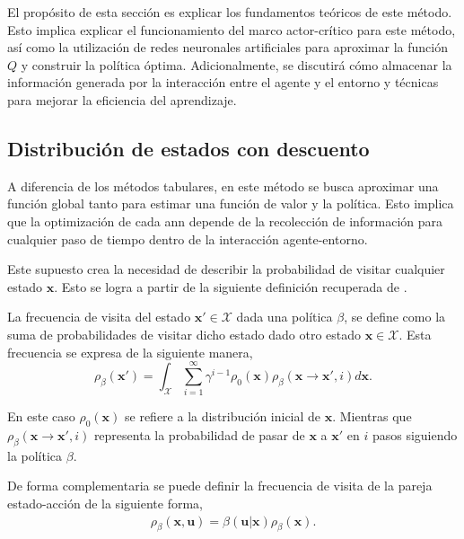 El propósito de esta sección es explicar los fundamentos teóricos de este método. Esto implica explicar el funcionamiento del marco actor-crítico para este método, así como la utilización de redes neuronales artificiales para aproximar la función $Q$ y construir la política óptima. Adicionalmente, se discutirá cómo almacenar la información generada por la interacción entre el agente y el entorno y técnicas para mejorar la eficiencia del aprendizaje.

\subsection{Distribución de estados con descuento}

A diferencia de los métodos tabulares, en este método se busca aproximar una función global tanto para estimar una función de valor y la política. Esto implica que la optimización de cada \acrshort{ann} depende de la recolección de información para cualquier paso de tiempo dentro de la interacción agente-entorno. 

Este supuesto crea la necesidad de describir la probabilidad de visitar cualquier estado $\mathbf{x}$. Esto se logra a partir de la siguiente definición recuperada de \cite{silver14}.

\begin{definition}
    La frecuencia de visita del estado $\mathbf{x}' \in \mathcal{X}$ dada una política $\beta$, se define como la suma de probabilidades de visitar dicho estado dado otro estado $\mathbf{x} \in \mathcal{X}$. Esta frecuencia se expresa de la siguiente manera,
    $$\rho_{\beta}(\mathbf{x}') = \int_{\mathcal{X}}\sum_{i=1}^{\infty}\gamma^{i-1}\rho_{0}(\mathbf{x})\rho_{\beta}\left(\mathbf{x}\rightarrow \mathbf{x}', i\right)d\mathbf{x}.$$
    
En este caso $\rho_{0}(\mathbf{x})$ se refiere a la distribución inicial de $\mathbf{x}$. Mientras que $\rho_{\beta}(\mathbf{x}\rightarrow\mathbf{x}', i)$ representa la probabilidad de pasar de $\mathbf{x}$ a $\mathbf{x}'$ en $i$ pasos siguiendo la política $\beta$.

\label{def:state_frecuency}
\end{definition}

De forma complementaria se puede definir la frecuencia de visita de la pareja estado-acción de la siguiente forma,
\begin{align}
    \rho_{\beta}(\mathbf{x}, \mathbf{u}) = \beta(\mathbf{u}|\mathbf{x})\rho_{\beta}(\mathbf{x}).    
\end{align}

